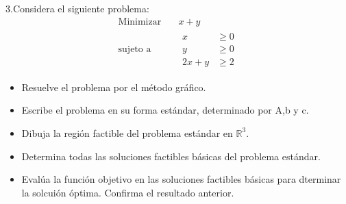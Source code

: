 \documentclass{article}
\begin{document}
3.Considera el siguiente problema:
\begin{equation*}
  \begin{aligned}
    \text{Minimizar}\quad & x+y \\
    \text{sujeto a}\quad &
    \begin{aligned}
      x & \geq 0 \\
      y & \geq 0 \\
      2x+y & \geq 2
    \end{aligned}
  \end{aligned}
\end{equation*}

\begin{itemize}
\item Resuelve el problema por el método gráfico.
\item Escribe el problema en su forma estándar, determinado por A,b y c.
\item Dibuja la región factible del problema estándar en $\mathbb{R}^3$.
\item Determina todas  las soluciones factibles básicas del problema estándar.
\item Evalúa la función objetivo en las soluciones factibles básicas para dterminar la solcuión óptima. Confirma el resultado anterior.
\end{itemize}
\end{document}
